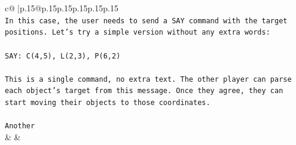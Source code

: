 \documentclass{article}
\begin{document}
{\begin{supertabular}{c@{$\;$}|p{.15\linewidth}@{}p{.15\linewidth}p{.15\linewidth}p{.15\linewidth}p{.15\linewidth}p{.15\linewidth}}
{{{\\ 
\texttt{In this case, the user needs to send a SAY command with the target positions. Let's try a simple version without any extra words:} \\
\\ 
\texttt{SAY: C(4,5), L(2,3), P(6,2)} \\
\\ 
\texttt{This is a single command, no extra text. The other player can parse each object's target from this message. Once they agree, they can start moving their objects to those coordinates.} \\
\\ 
\texttt{Another} \\
            }
        }
    }
    & & \\ \\


\end{supertabular}}
\end{document}
